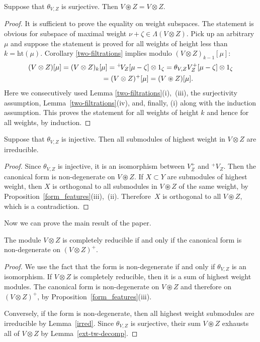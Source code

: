 \begin{Lemma}\label{ext-tw-decomp}Suppose that $\theta_{V,Z}$ is surjective. Then $V\circledast Z=V\otimes Z$.
\end{Lemma}
\begin{proof} It is sufficient to prove the equality on weight subspaces. The statement is obvious for subspace of maximal weight $\nu+\zeta\in \Lambda(V\otimes Z)$. Pick up an arbitrary $\mu$ and suppose the statement is proved for all weights of height less than $k=\mathrm{ht}(\mu)$. Corollary \ref{two-filtrations} implies modulo $(V\otimes Z)_{k-1}[\mu]$:
\begin{gather*}
(V\otimes Z)[\mu]=(V\otimes Z)_k[\mu]={}^+\!V_Z[\mu-\zeta]\otimes 1_\zeta=\theta_{V,Z}V^+_Z[\mu-\zeta]\otimes 1_\zeta\\
\hphantom{(V\otimes Z)[\mu]}{} =(V\otimes Z)^+[\mu] =(V\circledast Z)[\mu].
\end{gather*}
Here we consecutively used Lemma \ref{two-filtrations}(i),~(iii), the surjectivity assumption, Lemma~\ref{two-filtrations}(iv), and, finally, (i) along with the induction assumption. This proves the statement for all weights of height $k$ and hence for all weights, by induction.
\end{proof}

\begin{Lemma}\label{irred} Suppose that $\theta_{V,Z} $ is injective. Then all submodules of highest weight in $V\otimes Z$ are irreducible.
\end{Lemma}
\begin{proof}Since $\theta_{V,Z} $ is injective, it is an isomorphism between $V^+_Z$ and ${}^+\!V_Z$. Then the canonical form is non-degenerate on $V\circledast Z$. If $X\subset Y$ are submodules of highest weight, then $X$ is orthogonal to all submodules in $V\circledast Z$ of the same weight, by Proposition~\ref{form_features}(iii),~(ii). Therefore~$X$ is orthogonal to all $V\circledast Z$, which is a contradiction.
\end{proof}

Now we can prove the main result of the paper.
\begin{Theorem} \label{dir-sum}The module $V\otimes Z$ is completely reducible if and only if the canonical form is non-degenerate on $(V\otimes Z)^+$.
\end{Theorem}
\begin{proof}We use the fact that the form is non-degenerate if and only if $\theta_{V,Z}$ is an isomorphism. If $V\otimes Z$ is completely reducible, then it is a sum of highest weight modules. The canonical form is non-degenerate on $V\circledast Z$ and therefore on $(V\otimes Z)^+$, by Proposition~\ref{form_features}(iii).

Conversely, if the form is non-degenerate, then all highest weight submodules are irreducible by Lemma~\ref{irred}. Since $\theta_{V,Z}$ is surjective, their sum $V\circledast Z$ exhausts all of $V\otimes Z$ by Lemma~\ref{ext-tw-decomp}.
\end{proof}

